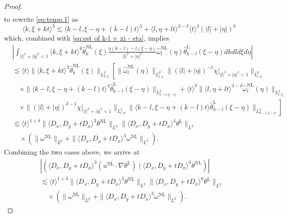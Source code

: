 \documentclass[reqno, 12pt]{amsart} %
\theoremstyle{plain} %
\theoremstyle{definition}
\theoremstyle{remark}
\numberwithin{equation}{section} %
\begin{document}
\begin{proof}
\begin{align}
		\end{align}
		to rewrite \eqref{eq:temp.1} as 
		$$
		\langle k, \xi+k t\rangle^3 \lesssim\langle k-l, \xi-\eta+(k-l) t\rangle^3 +  \langle l, \eta+l t\rangle^{3-\delta}\langle t\rangle^\delta(|l|+|\eta|)^\delta
		$$
		which, combined with \eqref{eq:est of k-l + xi - eta}, implies
		\begin{equation} \label{eq:temp0.1}
		\begin{aligned}
			&\left|\int_{|l|^2+|\eta|^2<1}\langle k, \xi+k t\rangle^6 \hat{\theta}_k^{\mathrm{NL}}(\xi) \frac{\eta(k-l)-l(\xi-\eta)}{|l|^2+|\eta|^2} \hat{\omega}_l^{\mathrm{NL}}(\eta) \hat{\theta}_{k-l}^{\mathrm{L}}(\xi-\eta) d k d l d \xi d \eta\right| \\
			& \lesssim\langle t\rangle\|\langle k, \xi+k t\rangle^3 \hat{\theta}_k^{\mathrm{NL}}(\xi)\|_{L_{k, \xi}^2}\left[\|\hat{\omega}_l^{\mathrm{NL}}(\eta)\|_{L_{l, \eta}^{p^{\prime}}}\|(|l|+|\eta|)^{-1}  \left. \chi\right|_{|l|^2+|\eta|^2<1}\|_{L_{l, \eta}^p}\right. \\
			& \quad \times\|\langle k-l, \xi-\eta+(k-l) t\rangle^4 \hat{\theta}_{k-l}^{\mathrm{L}}(\xi-\eta)\|_{L_{k-l, \xi-\eta}^2}+\langle t\rangle^\delta\|\langle l, \eta+l t\rangle^{3-\delta} \hat{\omega}_l^{\mathrm{NL}}(\eta)\|_{L_{l, \eta}^2} \\
			& \quad \left.\times\|(|l|+|\eta|)^{\delta-1} \left. \chi\right|_{|l|^2+|\eta|^2<1}\|_{L_{l, \eta}^2}\|\langle k-l, \xi-\eta+(k-l) t\rangle \hat{\theta}_{k-l}^{\mathrm{L}}(\xi-\eta)\|_{L_{k-l, \xi-\eta}^2}\right] \\
			& \lesssim\langle t\rangle^{1+\delta}\|\langle D_x, D_y+t D_x\rangle^3 \theta^{\mathrm{NL}}\|_{L^2} \|\langle D_x, D_y+t D_x\rangle^4 \theta^{\mathrm{L}}\|_{L^2}\\
			& \quad \times \left(\|\omega^{\mathrm{NL}}\|_{L^p}+\|\langle D_x, D_y+t D_x\rangle^3 \omega^{\mathrm{NL}}\|_{L^2}\right).
		\end{aligned}   
		\end{equation}
		Combining the two cases above, we arrive at
		\begin{equation}\begin{aligned} \label{eq:est of reaction term}
				& \left|\left(\langle D_x, D_y+t D_x\rangle^3\left(u^{\mathrm{NL}} \cdot \nabla \theta^{\mathrm{L}}\right) \mid\langle D_x, D_y+t D_x\rangle^3 \theta^{\mathrm{NL}}\right)\right| \\
				& \lesssim\langle t\rangle^{1+\delta}\|\langle D_x, D_y+t D_x\rangle^3 \theta^{\mathrm{NL}}\|_{L^2} \|\langle D_x, D_y+t D_x\rangle^6 \theta^{\mathrm{L}}\|_{L^2}\\
				& \quad \times \left(\|\omega^{\mathrm{NL}}\|_{L^p}+\|\langle D_x, D_y+t D_x\rangle^3 \omega^{\mathrm{NL}}\|_{L^2}\right).
		\end{aligned}\end{equation}
		

\end{proof}
\end{document}
